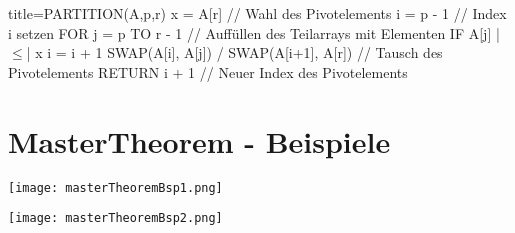         \begin{ccode}[autogobble,escapeinside=||]{title={PARTITION(A,p,r)}}
        x = A[r]    // Wahl des Pivotelements
        i = p - 1   // Index i setzen
        FOR j = p TO r - 1 // Auffüllen des Teilarrays mit Elementen
            IF A[j] |$\leq$| x
                i = i + 1
                SWAP(A[i], A[j]) /
        SWAP(A[i+1], A[r]) // Tausch des Pivotelements
        RETURN i + 1 // Neuer Index des Pivotelements
        \end{ccode}
    
\section*{MasterTheorem - Beispiele}

\centerline{\texttt{[image: masterTheoremBsp1.png]}}
\centerline{\texttt{[image: masterTheoremBsp2.png]}}
    
